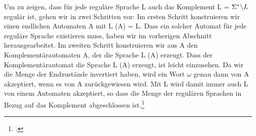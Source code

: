 \documentclass{lehramt-informatik-haupt}
\begin{document}
Um zu zeigen, dass für jede reguläre Sprache L auch das Komplement L =
$\Sigma^* \string\ L$ regulär ist, gehen wir in zwei Schritten vor: Im
ersten Schritt konstruieren wir einen endlichen Automaten A mit L (A) =
L. Dass ein solcher Automat für jede reguläre Sprache existieren muss,
haben wir im vorherigen Abschnitt herausgearbeitet. Im zweiten Schritt
konstruieren wir aus A den Komplementärautomaten A, der die Sprache L
(A) erzeugt. Dass der Komplementärautomat die Sprache L (A) erzeugt, ist
leicht einzusehen. Da wir die Menge der Endzustände invertiert haben,
wird ein Wort $\omega$ genau dann von A akzeptiert, wenn es von A
zurückgewiesen wird. Mit L wird damit immer auch L von einem Automaten
akzeptiert, so dass die Menge der regulären Sprachen in Bezug auf das
Komplement abgeschlossen ist.\footcite[Seite 218-219]{hoffmann}

\literatur
\end{document}
